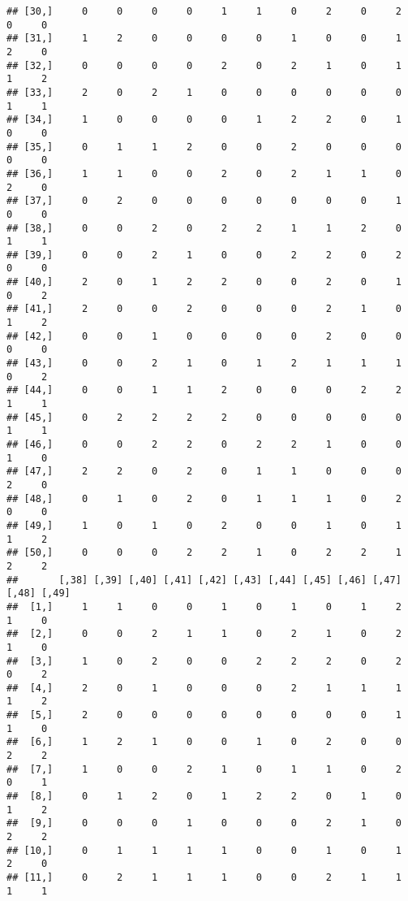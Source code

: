 \documentclass[
]{article}
\begin{document}
\begin{verbatim}
## [30,]     0     0     0     0     1     1     0     2     0     2     0     0
## [31,]     1     2     0     0     0     0     1     0     0     1     2     0
## [32,]     0     0     0     0     2     0     2     1     0     1     1     2
## [33,]     2     0     2     1     0     0     0     0     0     0     1     1
## [34,]     1     0     0     0     0     1     2     2     0     1     0     0
## [35,]     0     1     1     2     0     0     2     0     0     0     0     0
## [36,]     1     1     0     0     2     0     2     1     1     0     2     0
## [37,]     0     2     0     0     0     0     0     0     0     1     0     0
## [38,]     0     0     2     0     2     2     1     1     2     0     1     1
## [39,]     0     0     2     1     0     0     2     2     0     2     0     0
## [40,]     2     0     1     2     2     0     0     2     0     1     0     2
## [41,]     2     0     0     2     0     0     0     2     1     0     1     2
## [42,]     0     0     1     0     0     0     0     2     0     0     0     0
## [43,]     0     0     2     1     0     1     2     1     1     1     0     2
## [44,]     0     0     1     1     2     0     0     0     2     2     1     1
## [45,]     0     2     2     2     2     0     0     0     0     0     1     1
## [46,]     0     0     2     2     0     2     2     1     0     0     1     0
## [47,]     2     2     0     2     0     1     1     0     0     0     2     0
## [48,]     0     1     0     2     0     1     1     1     0     2     0     0
## [49,]     1     0     1     0     2     0     0     1     0     1     1     2
## [50,]     0     0     0     2     2     1     0     2     2     1     2     2
##       [,38] [,39] [,40] [,41] [,42] [,43] [,44] [,45] [,46] [,47] [,48] [,49]
##  [1,]     1     1     0     0     1     0     1     0     1     2     1     0
##  [2,]     0     0     2     1     1     0     2     1     0     2     1     0
##  [3,]     1     0     2     0     0     2     2     2     0     2     0     2
##  [4,]     2     0     1     0     0     0     2     1     1     1     1     2
##  [5,]     2     0     0     0     0     0     0     0     0     1     1     0
##  [6,]     1     2     1     0     0     1     0     2     0     0     2     2
##  [7,]     1     0     0     2     1     0     1     1     0     2     0     1
##  [8,]     0     1     2     0     1     2     2     0     1     0     1     2
##  [9,]     0     0     0     1     0     0     0     2     1     0     2     2
## [10,]     0     1     1     1     1     0     0     1     0     1     2     0
## [11,]     0     2     1     1     1     0     0     2     1     1     1     1

\end{verbatim}
\end{document}
